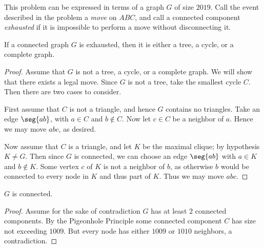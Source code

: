 This problem can be expressed in terms of a graph $G$ of size $2019$. Call the event described in the problem a \textit{move} on $ABC$, and call a connected component \textit{exhausted} if it is impossible to perform a move without disconnecting it.
\begin{boxlemma*}
    If a connected graph $G$ is exhausted, then it is either a tree, a cycle, or a complete graph.
\end{boxlemma*}
\begin{proof}
    Assume that $G$ is not a tree, a cycle, or a complete graph. We will show that there exists a legal move. Since $G$ is not a tree, take the smallest cycle $C$. Then there are two cases to consider.

    First assume that $C$ is not a triangle, and hence $G$ contains no triangles. Take an edge $\seg{ab}$, with $a\in C$ and $b\notin C$. Now let $c\in C$ be a neighbor of $a$. Hence we may move $abc$, as desired.

    Now assume that $C$ is a triangle, and let $K$ be the maximal clique; by hypothesis $K\ne G$. Then since $G$ is connected, we can choose an edge $\seg{ab}$ with $a\in K$ and $b\notin K$. Some vertex $c$ of $K$ is not a neighbor of $b$, as otherwise $b$ would be connected to every node in $K$ and thus part of $K$. Thus we may move $abc$.
\end{proof}
%
%
\begin{iclaim}
    $G$ is connected.
\end{iclaim}
\begin{proof}
    Assume for the sake of contradiction $G$ has at least $2$ connected components. By the Pigeonhole Principle some connected component $C$ has size not exceeding $1009$. But every node has either $1009$ or $1010$ neighbors, a contradiction.
\end{proof}

